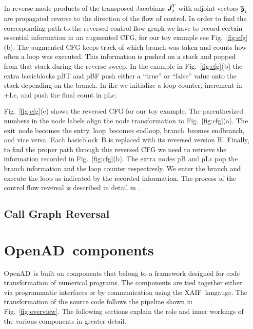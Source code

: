 \documentclass[11pt]{article}
\newcommand{\entry}{entry}
\newcommand{\exit}{exit}
\newcommand{\Loop}{loop}
\newcommand{\EndLoop}{endloop}
\newcommand{\branch}{branch}
\newcommand{\EndBranch}{endbranch}
\newcommand{\basicblock}{basicblock}
\newcommand{\OpenAD}{OpenAD}
\newcommand{\xaif}{XAIF}
\newcommand{\bmJ}{\mbox{\bf\em J}}
\newcommand{\bmy}{\mbox{\bf\em y}}
\newcommand{\reffig}[1]{{Fig.~\ref{#1}}}
\begin{document}
In reverse mode products of the transposed
Jacobians $\bmJ^T_j$ with adjoint vectors $\overline{\bmy}_j$
are propagated reverse to the direction of the flow of control. 
In order to find the corresponding path to the reversed control flow graph 
we have to record certain essential information in an augmented CFG,
for our toy example see \reffig{fig:cfg}(b).
The augmented CFG  keeps track of which branch was taken and counts how often a loop was 
executed.  
This information is pushed on  a stack and popped from that stack during the 
reverse sweep.  
In the example in \reffig{fig:cfg}(b) the extra {\basicblock}s pBT and pBF push 
either a ``true'' or ``false'' value onto the stack depending on the branch. 
In iLc we initialize a loop counter, increment in +Lc, and push the final 
count in pLc. 

\reffig{fig:cfg}(c) shows the reversed CFG for our toy example. 
The parenthesized numbers in the node labels align the 
node transformation to \reffig{fig:cfg}(a). 
The \exit\ node becomes 
the \entry, \Loop\ becomes \EndLoop, \branch\ beomes \EndBranch, and vice versa. 
Each \basicblock\  B is replaced with its reversed version B'.  
Finally, to find the proper path through this reversed CFG we need to retrieve 
the information recorded in  \reffig{fig:cfg}(b). The extra nodes pB and pLc 
pop the branch information and the loop counter respectively.  
We enter the branch and execute the loop as indicated by the recorded information. 
The process of the control flow reversal is described in detail in 
\cite{NULF04CFR}. 

\subsection{Call Graph Reversal} \label{ssec:cgReversal}

\section{\OpenAD\ components}

\OpenAD\ is built on components that belong to a framework designed
for code transformation of numerical programs.  The components are
tied together either via programmatic interfaces or by communication
using the \xaif\ langauge. The transformation of the source code follows the
pipeline shown in \reffig{fig:overview}.  The following sections
explain the role and inner workings of the various components in
greater detail.
\end{document}
